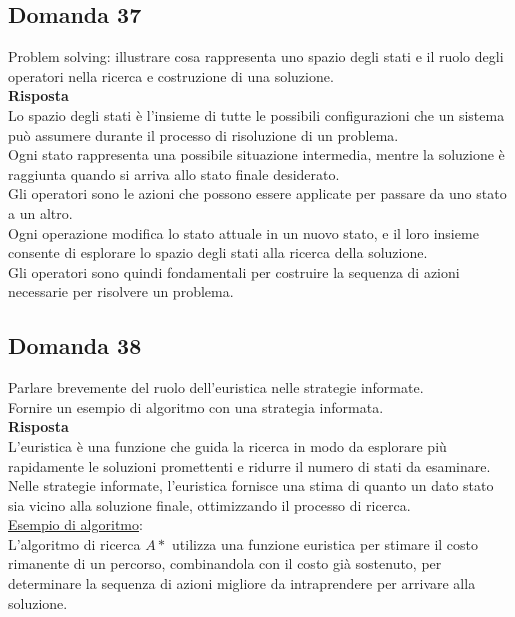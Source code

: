 \documentclass[../main.tex]{subfiles}
\begin{document}
	\subsection{Domanda 37}
	Problem solving: illustrare cosa rappresenta uno spazio degli stati e il ruolo degli operatori nella ricerca e costruzione di una soluzione.\\
	\textbf{Risposta}\\
	Lo spazio degli stati è l'insieme di tutte le possibili configurazioni che un sistema può assumere durante il processo di risoluzione di un problema.\\
	Ogni stato rappresenta una possibile situazione intermedia, mentre la soluzione è raggiunta quando si arriva allo stato finale desiderato.\\
	Gli operatori sono le azioni che possono essere applicate per passare da uno stato a un altro. \\
	Ogni operazione modifica lo stato attuale in un nuovo stato, e il loro insieme consente di esplorare lo spazio degli stati alla ricerca della soluzione.\\
	Gli operatori sono quindi fondamentali per costruire la sequenza di azioni necessarie per risolvere un problema.
	\subsection{Domanda 38}
	Parlare brevemente del ruolo dell’euristica nelle strategie informate. \\
	Fornire un esempio di algoritmo con una strategia informata.\\
	\textbf{Risposta}\\
	L'euristica è una funzione che guida la ricerca in modo da esplorare più rapidamente le soluzioni promettenti e ridurre il numero di stati da esaminare. \\
	Nelle strategie informate, l'euristica fornisce una stima di quanto un dato stato sia vicino alla soluzione finale, ottimizzando il processo di ricerca.\\
	\underline{Esempio di algoritmo}: \\
	L'algoritmo di ricerca $A*$ utilizza una funzione euristica per stimare il costo rimanente di un percorso, combinandola con il costo già sostenuto, per determinare la sequenza di azioni migliore da intraprendere per arrivare alla soluzione.
\end{document}
